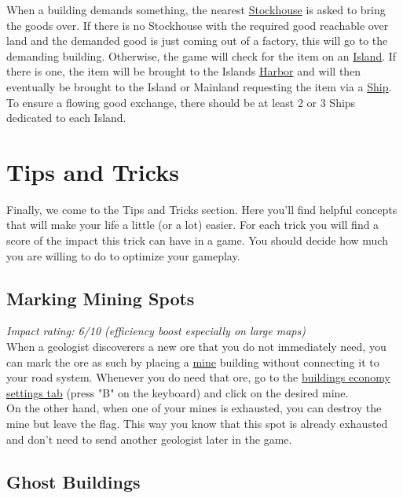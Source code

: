 \documentclass[12pt]{article}
\begin{document}
When a building demands something, the nearest \hyperref[sec:stockhouse]{Stockhouse} is asked to bring the goods over. If there is no Stockhouse with the required good reachable over land and the demanded good is just coming out of a factory, this will go to the demanding building. Otherwise, the game will check for the item on an \hyperref[sec:islands]{Island}. If there is one, the item will be brought to the Islands \hyperref[sec:harbor]{Harbor} and will then eventually be brought to the Island or Mainland requesting the item via a \hyperref[sec:ships]{Ship}. To ensure a flowing good exchange, there should be at least 2 or 3 Ships dedicated to each Island.

\section{Tips and Tricks}
\label{sec:tipsandtricks}

Finally, we come to the Tips and Tricks section. Here you'll find helpful concepts that will make your life a little (or a lot) easier. For each trick you will find a score of the impact this trick can have in a game. You should decide how much you are willing to do to optimize your gameplay.

\subsection{Marking Mining Spots}

\textit{Impact rating: 6/10 (efficiency boost especially on large maps)}\\

When a geologist discoverers a new ore that you do not immediately need, you can mark the ore as such by placing a \hyperref[sec:mines]{mine} building without connecting it to your road system. Whenever you do need that ore, go to the \hyperref[sec:economybuildings]{buildings economy settings tab} (press "B" on the keyboard) and click on the desired mine.\\

On the other hand, when one of your mines is exhausted, you can destroy the mine but leave the flag. This way you know that this spot is already exhausted and don't need to send another geologist later in the game.

\subsection{Ghost Buildings}
\label{sec:ghostbuildings}
\end{document}
